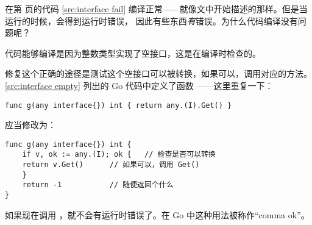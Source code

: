 \begin{Exercise}[title={接口和编译},difficulty=6]
\Question
在第 \pageref{src:interface fail} 页的代码 \ref{src:interface fail} 
编译正常——就像文中开始描述的那样。但是当运行的时候，会得到运行时错误，
因此有些东西\emph{有}错误。为什么代码编译没有问题呢？
\end{Exercise}

\begin{Answer}
\Question
代码能够编译是因为整数类型实现了空接口，这是在编译时检查的。

修复这个正确的途径是测试这个空接口可以被转换，如果可以，调用对应的方法。
\ref{src:interface empty} 列出的 Go 代码中定义了函数 ——这里重复一下：
\begin{lstlisting}
func g(any interface{}) int { return any.(I).Get() }
\end{lstlisting}

\noindent{}应当修改为：
\begin{lstlisting}
func g(any interface{}) int {
    if v, ok := any.(I); ok {	// 检查是否可以转换
	return v.Get()		// 如果可以，调用 Get()
    }
    return -1			// 随便返回个什么
}
\end{lstlisting}
如果现在调用 ，就不会有运行时错误了。在 Go 中这种用法被称作``comma ok''。
\end{Answer}

